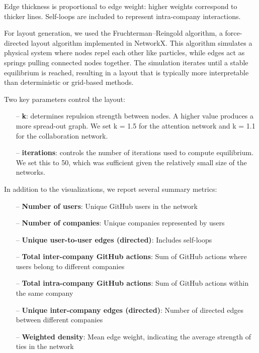 Edge thickness is proportional to edge weight: higher weights correspond to thicker lines. Self-loops are included to represent intra-company interactions.

For layout generation, we used the Fruchterman–Reingold algorithm, a force-directed layout algorithm implemented in NetworkX. This algorithm simulates a physical system where nodes repel each other like particles, while edges act as springs pulling connected nodes together. The simulation iterates until a stable equilibrium is reached, resulting in a layout that is typically more interpretable than deterministic or grid-based methods.

Two key parameters control the layout:

\begin{itemize}
    \item[--] \textbf{k}: determines repulsion strength between nodes. A higher value produces a more spread-out graph. We set k = 1.5 for the attention network and k = 1.1 for the collaboration network.
    \item[--] \textbf{iterations}: controls the number of iterations used to compute equilibrium. We set this to 50, which was sufficient given the relatively small size of the networks.
\end{itemize}

In addition to the visualizations, we report several summary metrics:

\begin{itemize}
    \item[--] \textbf{Number of users}: Unique GitHub users in the network
    \item[--] \textbf{Number of companies}: Unique companies represented by users
    \item[--] \textbf{Unique user-to-user edges (directed)}: Includes self-loops
    \item[--] \textbf{Total inter-company GitHub actions}: Sum of GitHub actions where users belong to different companies
    \item[--] \textbf{Total intra-company GitHub actions}: Sum of GitHub actions within the same company
    \item[--] \textbf{Unique inter-company edges (directed)}: Number of directed edges between different companies
    \item[--] \textbf{Weighted density}: Mean edge weight, indicating the average strength of ties in the network
\end{itemize}





